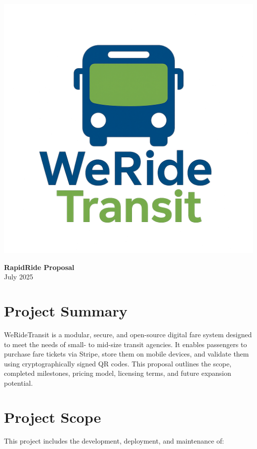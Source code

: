 \documentclass[12pt]{article}
\begin{document}
\begin{minipage}{0.3\textwidth}
    \includegraphics[width=\textwidth]{WeRideTransit_vertical.png}
\end{minipage}
\hfill
\begin{minipage}{0.65\textwidth}
    \centering
    {\Huge\bfseries RapidRide Proposal}\\[0.5em]
    {\large July 2025}
\end{minipage}

\section{Project Summary}
WeRideTransit is a modular, secure, and open-source digital fare system designed to meet the needs of small- to mid-size transit agencies. It enables passengers to purchase fare tickets via Stripe, store them on mobile devices, and validate them using cryptographically signed QR codes. This proposal outlines the scope, completed milestones, pricing model, licensing terms, and future expansion potential.

\section{Project Scope}
This project includes the development, deployment, and maintenance of:
\end{document}
